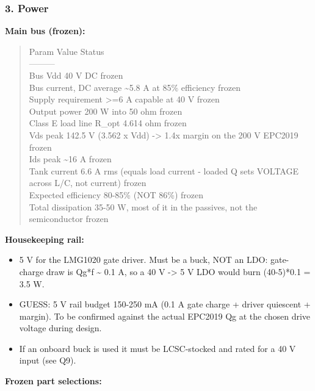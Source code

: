 \documentclass[11pt,a4paper]{article}
\begin{document}
\subsubsection*{3. Power}
\textbf{Main bus (frozen):}

\begin{quote}\small\ttfamily\raggedright
\textbar{} Param \textbar{} Value \textbar{} Status \textbar{}\\
\textbar{}---\textbar{}---\textbar{}---\textbar{}\\
\textbar{} Bus Vdd \textbar{} 40 V DC \textbar{} frozen \textbar{}\\
\textbar{} Bus current, DC average \textbar{} \textasciitilde{}5.8 A at 85\% efficiency \textbar{} frozen \textbar{}\\
\textbar{} Supply requirement \textbar{} \textgreater{}=6 A capable at 40 V \textbar{} frozen \textbar{}\\
\textbar{} Output power \textbar{} 200 W into 50 ohm \textbar{} frozen \textbar{}\\
\textbar{} Class E load line R\_opt \textbar{} 4.614 ohm \textbar{} frozen \textbar{}\\
\textbar{} Vds peak \textbar{} 142.5 V (3.562 x Vdd) -\textgreater{} 1.4x margin on the 200 V EPC2019 \textbar{} frozen \textbar{}\\
\textbar{} Ids peak \textbar{} \textasciitilde{}16 A \textbar{} frozen \textbar{}\\
\textbar{} Tank current \textbar{} 6.6 A rms (equals load current - loaded Q sets VOLTAGE across L/C, not current) \textbar{} frozen \textbar{}\\
\textbar{} Expected efficiency \textbar{} 80-85\% (NOT 86\%) \textbar{} frozen \textbar{}\\
\textbar{} Total dissipation \textbar{} 35-50 W, most of it in the passives, not the semiconductor \textbar{} frozen \textbar{}
\end{quote}
\textbf{Housekeeping rail:}

\begin{itemize}
\item 5 V for the LMG1020 gate driver. Must be a buck, NOT an LDO: gate-charge draw is Qg{*}f \textasciitilde{} 0.1 A,
so a 40 V -\textgreater{} 5 V LDO would burn (40-5){*}0.1 = 3.5 W.
\item GUESS: 5 V rail budget 150-250 mA (0.1 A gate charge + driver quiescent + margin). To be
confirmed against the actual EPC2019 Qg at the chosen drive voltage during design.
\item If an onboard buck is used it must be LCSC-stocked and rated for a 40 V input (see Q9).
\end{itemize}
\textbf{Frozen part selections:}
\end{document}
